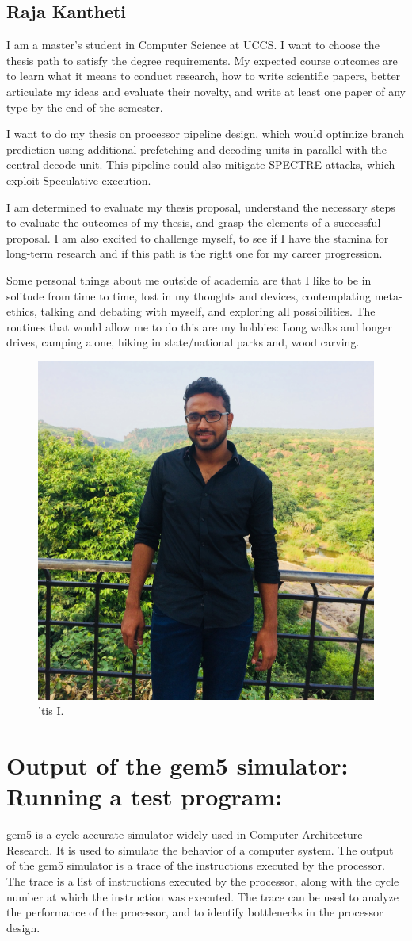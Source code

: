 \subsection{Raja Kantheti}
I am a master's student in Computer Science at UCCS. I want to choose the thesis path to satisfy the degree requirements. My expected course outcomes are to learn what it means to conduct research, how to write scientific papers, better articulate my ideas and evaluate their novelty, and write at least one paper of any type by the end of the semester.

I want to do my thesis on processor pipeline design, which would optimize branch prediction using additional prefetching and decoding units in parallel with the central decode unit. This pipeline could also mitigate SPECTRE attacks, which exploit Speculative execution. 

I am determined to evaluate my thesis proposal, understand the necessary steps to evaluate the outcomes of my thesis, and grasp the elements of a successful proposal. I am also excited to challenge myself, to see if I have the stamina for long-term research and if this path is the right one for my career progression.

Some personal things about me outside of academia are that I like to be in solitude from time to time, lost in my thoughts and devices, contemplating meta-ethics, talking and debating with myself, and exploring all possibilities. The routines that would allow me to do this are my hobbies: Long walks and longer drives, camping alone, hiking in state/national parks and, wood carving. 
\begin{figure}[h]
\centering
\includegraphics[width=0.25\linewidth]{images/IMG_1667.JPG}
\caption{'tis I. }
\end{figure}

\section*{Output of the gem5 simulator: Running a test program: }
gem5 is a cycle accurate simulator widely used in Computer Architecture Research. 
It is used to simulate the behavior of a computer system. 
The output of the gem5 simulator is a trace of the instructions executed by the processor. 
The trace is a list of instructions executed by the processor, along with the cycle number at which the instruction was executed.
The trace can be used to analyze the performance of the processor, and to identify bottlenecks in the processor design.

